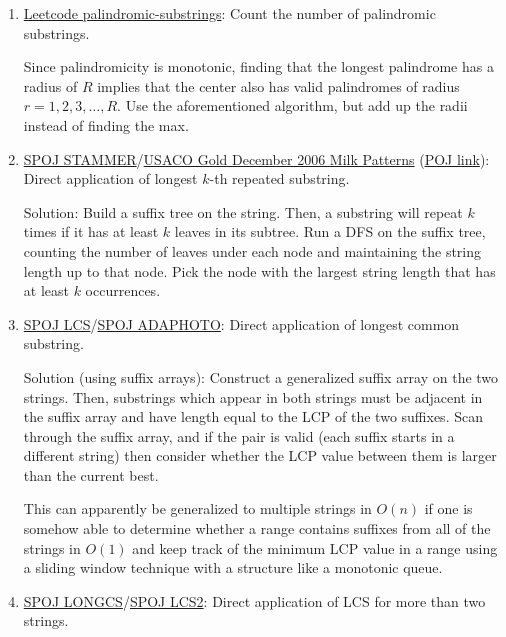 \documentclass[11pt, oneside]{article}
\begin{document}
\begin{enumerate}
  \item \href{https://leetcode.com/problems/palindromic-substrings/}{Leetcode palindromic-substrings}: Count the number of palindromic substrings.

  Since palindromicity is monotonic, finding that the longest palindrome has a radius of
  \( R \) implies that the center also has valid palindromes of radius \( r = 1, 2, 3, \dots, R \).
  Use the aforementioned algorithm, but add up the radii instead of finding the max.

  \item \href{https://www.spoj.com/problems/STAMMER/}{SPOJ STAMMER}/\href{https://contest.usaco.org/DEC06.htm}{USACO Gold December 2006 Milk Patterns} (\href{http://poj.org/problem?id=3261}{POJ link}): \\ Direct application of longest \( k \)-th repeated substring.

  Solution: Build a suffix tree on the string. Then, a substring will repeat \( k \) times
  if it has at least \( k \) leaves in its subtree. Run a DFS on the suffix tree, counting
  the number of leaves under each node and maintaining the string length up to that node.
  Pick the node with the largest string length that has at least \( k \) occurrences.

  \item \href{https://www.spoj.com/problems/LCS/}{SPOJ LCS}/\href{http://www.spoj.com/problems/ADAPHOTO/}{SPOJ ADAPHOTO}:
  Direct application of longest common substring.

  Solution (using suffix arrays): Construct a generalized suffix array on the two strings.
  Then, substrings which appear in both strings must be adjacent in the suffix array and
  have length equal to the LCP of the two suffixes.
  Scan through the suffix array, and if the pair is valid (each suffix starts in a different string)
  then consider whether the LCP value between them is larger than the current best.

  This can apparently be generalized to multiple strings in \( O(n) \)
  if one is somehow able to determine whether a range contains suffixes from all of the strings in \( O(1) \)
  and keep track of the minimum LCP value in a range using a sliding window technique with a structure like a monotonic queue.

  \item \href{https://www.spoj.com/problems/LONGCS/}{SPOJ LONGCS}/\href{http://www.spoj.com/problems/LCS2/}{SPOJ LCS2}:
  Direct application of LCS for more than two strings.


\end{enumerate}
\end{document}
